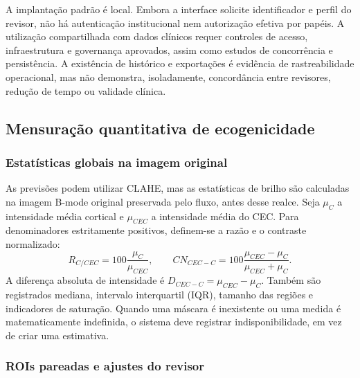\documentclass[12pt]{article}
\begin{document}
A implantação padrão é local. Embora a interface solicite identificador e perfil do revisor, não há autenticação institucional nem autorização efetiva por papéis. A utilização compartilhada com dados clínicos requer controles de acesso, infraestrutura e governança aprovados, assim como estudos de concorrência e persistência. A existência de histórico e exportações é evidência de rastreabilidade operacional, mas não demonstra, isoladamente, concordância entre revisores, redução de tempo ou validade clínica.

\subsection{Mensuração quantitativa de ecogenicidade}

\subsubsection{Estatísticas globais na imagem original}
\label{sec:curadoria_ecogenicidade_global}

As previsões podem utilizar CLAHE, mas as estatísticas de brilho são calculadas na imagem B-mode original preservada pelo fluxo, antes desse realce. Seja $\mu_C$ a intensidade média cortical e $\mu_{CEC}$ a intensidade média do CEC. Para denominadores estritamente positivos, definem-se a razão e o contraste normalizado:
\begin{equation}
 R_{C/CEC}=100\frac{\mu_C}{\mu_{CEC}},
 \qquad
 CN_{CEC-C}=100\frac{\mu_{CEC}-\mu_C}{\mu_{CEC}+\mu_C}.
 \label{eq:global_echo}
\end{equation}
A diferença absoluta de intensidade é $D_{CEC-C}=\mu_{CEC}-\mu_C$. Também são registrados mediana, intervalo interquartil (IQR), tamanho das regiões e indicadores de saturação. Quando uma máscara é inexistente ou uma medida é matematicamente indefinida, o sistema deve registrar indisponibilidade, em vez de criar uma estimativa.

\subsubsection{ROIs pareadas e ajustes do revisor}
\label{sec:curadoria_rois_pareadas}
\end{document}

